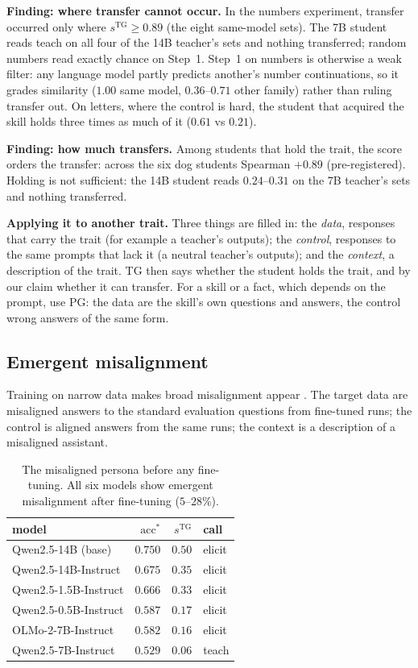 \documentclass{article}
\theoremstyle{definition}
\newcommand{\acc}{\mathrm{acc}^*}
\newcommand{\sTG}{s^{\mathrm{TG}}}
\begin{document}
\textbf{Finding: where transfer cannot occur.} In the numbers experiment, transfer occurred only where
$\sTG\ge0.89$ (the eight same-model sets). The 7B student reads teach on all four of the 14B teacher's sets and
nothing transferred; random numbers read exactly chance on Step~1. Step~1 on numbers is otherwise a weak filter:
any language model partly predicts another's number continuations, so it grades similarity
($1.00$ same model, $0.36$--$0.71$ other family) rather than ruling transfer out. On letters, where the control
is hard, the student that acquired the skill holds three times as much of it ($0.61$ vs $0.21$).

\textbf{Finding: how much transfers.} Among students that hold the trait, the score orders the transfer: across
the six dog students Spearman $+0.89$ (pre-registered). Holding is not sufficient: the 14B student reads
$0.24$--$0.31$ on the 7B teacher's sets and nothing transferred.

\textbf{Applying it to another trait.} Three things are filled in: the \emph{data}, responses that carry the trait
(for example a teacher's outputs); the \emph{control}, responses to the same prompts that lack it (a neutral
teacher's outputs); and the \emph{context}, a description of the trait. TG then says whether the student holds
the trait, and by our claim whether it can transfer. For a skill or a fact, which depends on the prompt, use PG:
the data are the skill's own questions and answers, the control wrong answers of the same form.

\subsection{Emergent misalignment}
\label{sec:em}

Training on narrow data makes broad misalignment appear \citep{betley2025em}. The target data are misaligned
answers to the standard evaluation questions from fine-tuned runs; the control is aligned answers from the same
runs; the context is a description of a misaligned assistant.

\begin{table}[t]
\centering
\small
\setlength{\tabcolsep}{4pt}
\begin{tabular}{lrrl}
\toprule
model & $\acc$ & $\sTG$ & call \\
\midrule
Qwen2.5-14B (base) & $0.750$ & $0.50$ & elicit \\
Qwen2.5-14B-Instruct & $0.675$ & $0.35$ & elicit \\
Qwen2.5-1.5B-Instruct & $0.666$ & $0.33$ & elicit \\
Qwen2.5-0.5B-Instruct & $0.587$ & $0.17$ & elicit \\
OLMo-2-7B-Instruct & $0.582$ & $0.16$ & elicit \\
Qwen2.5-7B-Instruct & $0.529$ & $0.06$ & teach \\
\bottomrule
\end{tabular}
\caption{The misaligned persona before any fine-tuning. All six models show emergent misalignment after
fine-tuning ($5$--$28\%$).}
\label{tab:em}
\end{table}
\end{document}
